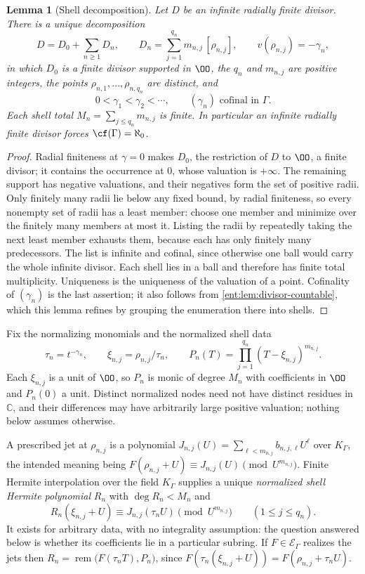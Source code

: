 \documentclass[11pt]{article}
\theoremstyle{plain}
\newtheorem{lemma}[lemma]{Lemma}
\theoremstyle{plain}
\theoremstyle{plain}
\theoremstyle{definition}
\theoremstyle{definition}
\theoremstyle{definition}
\theoremstyle{definition}
\theoremstyle{remark}
\newcommand{\C}{\mathbb C}\newcommand{\R}{\mathbb R}
\newcommand{\K}{K_\Gamma}\newcommand{\KD}{K_\Delta}
\newcommand{\E}{\mathcal E_\Gamma}
\DeclareMathOperator{\remp}{rem}\DeclareMathOperator{\Res}{Res}
\begin{document}
\begin{lemma}[Shell decomposition]\label{ent:lem:shells}
Let $D$ be an infinite radially finite divisor. There is a unique
decomposition
\[
 D=D_0+\sum_{n\ge1}D_n,\qquad
 D_n=\sum_{j=1}^{q_n}m_{n,j}\,[\rho_{n,j}],\qquad
 v(\rho_{n,j})=-\gamma_n,
\]
in which $D_0$ is a finite divisor supported in $\OO$, the $q_n$ and
$m_{n,j}$ are positive integers, the points $\rho_{n,1},\ldots,\rho_{n,q_n}$
are distinct, and
\[
 0<\gamma_1<\gamma_2<\cdots,\qquad(\gamma_n)\text{ cofinal in }\Gamma.
\]
Each shell total $M_n=\sum_{j\le q_n}m_{n,j}$ is finite. In particular an
infinite radially finite divisor forces $\cf(\Gamma)=\aleph_0$.
\end{lemma}
\begin{proof}
Radial finiteness at $\gamma=0$ makes $D_0$, the restriction of $D$ to
$\OO$, a finite divisor; it contains the occurrence at $0$, whose valuation
is $+\infty$. The remaining support has negative valuations, and their
negatives form the set of positive radii. Only finitely many radii lie below
any fixed bound, by radial finiteness, so every nonempty set of radii has a
least member: choose one member and minimize over the finitely many members
at most it. Listing the radii by repeatedly taking the next least member
exhausts them, because each has only finitely many predecessors. The list is
infinite and cofinal, since otherwise one ball would carry the whole infinite
divisor. Each shell lies in a ball and therefore has finite total
multiplicity. Uniqueness is the uniqueness of the valuation of a point.
Cofinality of $(\gamma_n)$ is the last assertion; it also follows from
\cref{ent:lem:divisor-countable}, which this lemma refines by grouping the
enumeration there into shells.
\end{proof}

Fix the normalizing monomials and the normalized shell data
\begin{equation}\label{ent:eq:shellpoly}
 \tau_n=t^{-\gamma_n},\qquad
 \xi_{n,j}=\rho_{n,j}/\tau_n,\qquad
 P_n(T)=\prod_{j=1}^{q_n}(T-\xi_{n,j})^{m_{n,j}} .
\end{equation}
Each $\xi_{n,j}$ is a unit of $\OO$, so $P_n$ is monic of degree $M_n$ with
coefficients in $\OO$ and $P_n(0)$ a unit. Distinct normalized nodes need not
have distinct residues in $\C$, and their differences may have arbitrarily
large positive valuation; nothing below assumes otherwise.

A prescribed jet at $\rho_{n,j}$ is a polynomial
$J_{n,j}(U)=\sum_{\ell<m_{n,j}}b_{n,j,\ell}U^\ell$ over $\K$, the intended
meaning being $F(\rho_{n,j}+U)\equiv J_{n,j}(U)\pmod{U^{m_{n,j}}}$. Finite
Hermite interpolation over the field $\K$ supplies a unique
\emph{normalized shell Hermite polynomial} $R_n$ with $\deg R_n<M_n$ and
\begin{equation}\label{ent:eq:normalizedjets}
 R_n(\xi_{n,j}+U)\equiv J_{n,j}(\tau_nU)\pmod{U^{m_{n,j}}}
 \qquad(1\le j\le q_n).
\end{equation}
It exists for arbitrary data, with no integrality assumption: the question
answered below is whether its coefficients lie in a particular subring. If
$F\in\E$ realizes the jets then $R_n=\remp\bigl(F(\tau_nT),P_n\bigr)$, since
$F(\tau_n(\xi_{n,j}+U))=F(\rho_{n,j}+\tau_nU)$.
\end{document}
